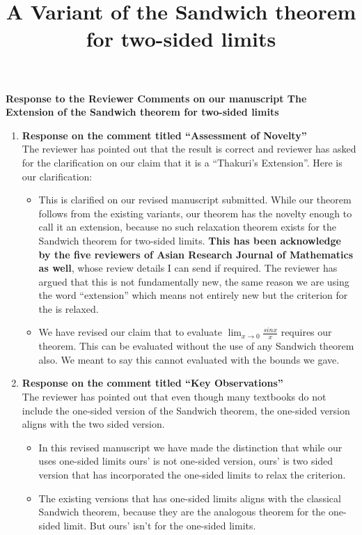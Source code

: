 \documentclass[a4paper,twoside,12pt]{article}
\title{\bfseries A Variant of the Sandwich theorem for two-sided limits}
\begin{document}
\begin{center}
{\large  \bfseries Response to the Reviewer Comments on our manuscript The Extension of the Sandwich theorem for two-sided limits}
\end{center}
\vspace{5mm}
\begin{enumerate}
\item \textbf{Response on the comment titled ``Assessment of Novelty'' } \\[2mm]
  The reviewer has pointed out that the result is correct and reviewer has asked for the clarification on our claim that it is a ``Thakuri's Extension''. Here is our clarification:
  \begin{itemize}
  \item
    This is clarified on our revised manuscript submitted. While our theorem follows from the existing variants, our theorem has the novelty enough to call it an extension, because no such relaxation theorem exists for the Sandwich theorem for two-sided limits. \textbf{This has been acknowledge by the five reviewers of Asian Research Journal of Mathematics as well}, whose review details I can send if required. The reviewer has argued that this is not fundamentally new, the same reason we are using the word ``extension'' which means not entirely new but the criterion for the is relaxed.
        \vspace{5mm}

 \item We have revised our claim that to evaluate \(\displaystyle \lim_{x \to 0} \frac{sinx}{x}\) requires our theorem. This can be evaluated without the use of any Sandwich theorem also. We meant to say this cannot evaluated with the bounds we gave.
    \end{itemize}

\vspace{2mm}
\item \textbf{Response on the comment titled ``Key Observations'' } \\[2mm]
  The reviewer has pointed out that even though many textbooks do not include the one-sided version of the Sandwich theorem, the one-sided version aligns with the two sided version. \\[3mm]
  \begin{itemize}
  \item In this revised manuscript we have made the distinction that while our uses one-sided limits ours' is not one-sided version, ours' is two sided version that has incorporated the one-sided limits to relax the criterion.
    \vspace{5mm}
    \item The existing versions that has one-sided limits aligns with the classical Sandwich theorem, because they are the analogous theorem for the one-sided limit. But ours' isn't for the one-sided limits.
  \end{itemize}


\end{enumerate}
\end{document}
